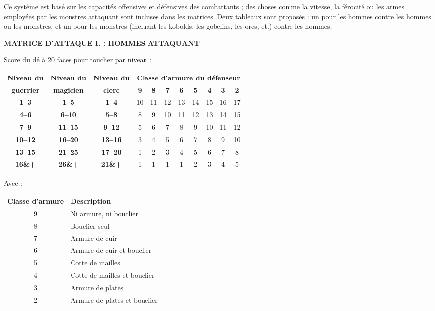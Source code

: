 Ce système est basé sur les capacités offensives et défensives des combattants ; des choses comme la vitesse, la férocité ou les armes employées par les monstres attaquant sont incluses dans les matrices. Deux tableaux sont proposés : un pour les hommes contre les hommes ou les monstres, et un pour les monstres (incluant les kobolds, les gobelins, les orcs, et.) contre les hommes.

\bigskip

\textbf{MATRICE D'ATTAQUE I. : HOMMES ATTAQUANT}

\bigskip

Score du dé à 20 faces pour toucher par niveau :

\bigskip

\begin{tabular}{cccccccccccc}
\textbf{Niveau du } & \textbf{Niveau du } & \textbf{Niveau du } & \multicolumn{8}{c}{\textbf{Classe d'armure du défenseur}} \\
\textbf{guerrier}   & \textbf{magicien}   & \textbf{clerc}   & \textbf{9} & \textbf{8} & \textbf{7} & \textbf{6} & \textbf{5} & \textbf{4} & \textbf{3} & \textbf{2} \\
\textbf{1--3}   & \textbf{1--5}   & \textbf{1--4}   & 10 & 11 & 12 & 13 & 14 & 15 & 16 & 17 \\
\textbf{4--6}   & \textbf{6--10}  & \textbf{5--8}   &  8 &  9 & 10 & 11 & 12 & 13 & 14 & 15 \\
\textbf{7--9}   & \textbf{11--15} & \textbf{9--12}  &  5 &  6 &  7 &  8 &  9 & 10 & 11 & 12 \\
\textbf{10--12} & \textbf{16--20} & \textbf{13--16} &  3 &  4 &  5 &  6 &  7 &  8 &  9 & 10 \\
\textbf{13--15} & \textbf{21--25} & \textbf{17--20} &  1 &  2 &  3 &  4 &  5 &  6 &  7 &  8 \\
\textbf{16\&+}  & \textbf{26\&+}  & \textbf{21\&+}  &  1 &  1 &  1 &  1 &  2 &  3 &  4 &  5 \\
\end{tabular}

\bigskip

Avec :

\bigskip

\begin{tabular}{cl}
\textbf{Classe d'armure} & \textbf{Description} \\
9 & Ni armure, ni bouclier \\
8 & Bouclier seul \\
7 & Armure de cuir \\
6 & Armure de cuir et bouclier \\
5 & Cotte de mailles \\
4 & Cotte de mailles et bouclier \\
3 & Armure de plates \\
2 & Armure de plates et bouclier \\
\end{tabular}

